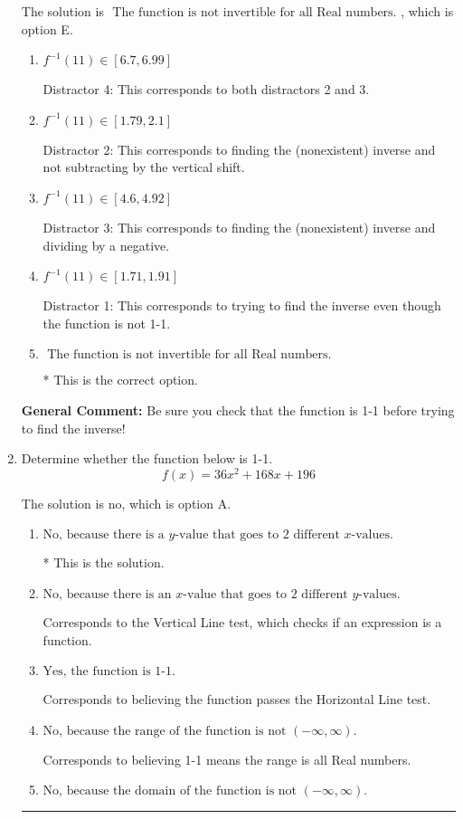 \documentclass{extbook}[14pt]
\newcommand{\litem}[1]{\item #1

\rule{\textwidth}{0.4pt}}
\begin{document}
\begin{enumerate}
{The solution is \( \text{ The function is not invertible for all Real numbers. } \), which is option E.\begin{enumerate}[label=\Alph*.]
\item \( f^{-1}(11) \in [6.7, 6.99] \)

 Distractor 4: This corresponds to both distractors 2 and 3.
\item \( f^{-1}(11) \in [1.79, 2.1] \)

 Distractor 2: This corresponds to finding the (nonexistent) inverse and not subtracting by the vertical shift.
\item \( f^{-1}(11) \in [4.6, 4.92] \)

 Distractor 3: This corresponds to finding the (nonexistent) inverse and dividing by a negative.
\item \( f^{-1}(11) \in [1.71, 1.91] \)

 Distractor 1: This corresponds to trying to find the inverse even though the function is not 1-1. 
\item \( \text{ The function is not invertible for all Real numbers. } \)

* This is the correct option.
\end{enumerate}

\textbf{General Comment:} Be sure you check that the function is 1-1 before trying to find the inverse!
}
\litem{
Determine whether the function below is 1-1.
\[ f(x) = 36 x^2 + 168 x + 196 \]

The solution is \( \text{no} \), which is option A.\begin{enumerate}[label=\Alph*.]
\item \( \text{No, because there is a $y$-value that goes to 2 different $x$-values.} \)

* This is the solution.
\item \( \text{No, because there is an $x$-value that goes to 2 different $y$-values.} \)

Corresponds to the Vertical Line test, which checks if an expression is a function.
\item \( \text{Yes, the function is 1-1.} \)

Corresponds to believing the function passes the Horizontal Line test.
\item \( \text{No, because the range of the function is not $(-\infty, \infty)$.} \)

Corresponds to believing 1-1 means the range is all Real numbers.
\item \( \text{No, because the domain of the function is not $(-\infty, \infty)$.} \)


\end{enumerate}}
\end{enumerate}
\end{document}
